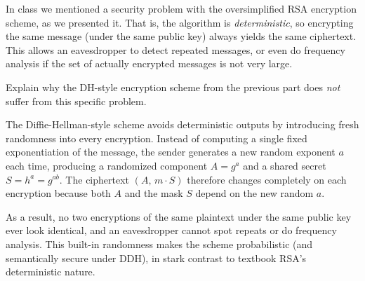 \documentclass[12pt, letterpaper]{article}
\begin{document}
\begin{subproblem}{}
    In class we mentioned a security problem with the oversimplified RSA encryption scheme, as we presented it. That is, the algorithm is \textit{deterministic}, so encrypting the same message (under the same public key) always yields the same ciphertext.
    This allows an eavesdropper to detect repeated messages, or even do frequency analysis if the set of actually encrypted messages is not very large. 
   
    Explain why the DH-style encryption scheme from the previous part does \emph{not} suffer from this specific problem.
\end{subproblem}
\begin{problemproof}
    The Diffie-Hellman-style scheme avoids deterministic outputs by introducing fresh randomness into every encryption.  Instead of computing a single fixed exponentiation of the message, the sender generates a new random exponent \(a\) each time, producing a randomized component \(A = g^a\) and a shared secret \(S = h^a = g^{ab}\).  The ciphertext \((A,\,m\cdot S)\) therefore changes completely on each encryption because both \(A\) and the mask \(S\) depend on the new random \(a\).

As a result, no two encryptions of the same plaintext under the same public key ever look identical, and an eavesdropper cannot spot repeats or do frequency analysis.  This built-in randomness makes the scheme probabilistic (and semantically secure under DDH), in stark contrast to textbook RSA’s deterministic nature.
\end{problemproof}
\end{document}
